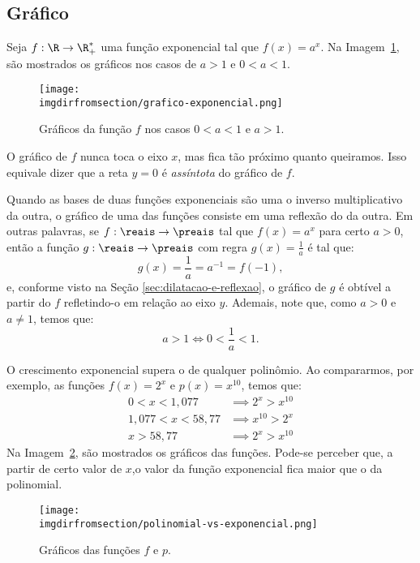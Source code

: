 \subsection{Gráfico}

\begin{example}
	Seja $f: \R \to \R_+^*$ uma função exponencial tal que $f(x) = a^x$. Na Imagem~\ref{img:graficos-exponencial}, são mostrados os gráficos nos casos de $a > 1$ e $0 < a < 1$.
	\begin{figure}[H]
		\centering
		\texttt{[image: \\imgdirfromsection/grafico-exponencial.png]}
		\caption{Gráficos da função $f$ nos casos $0<a<1$ e $a>1$.}
		\label{img:graficos-exponencial}
	\end{figure}
	O gráfico de $f$ nunca toca o eixo $x$, mas fica tão próximo quanto queiramos. Isso equivale dizer que a reta $y=0$ é \emph{assíntota} do gráfico de $f$.
\end{example}

\begin{remark}
	Quando as bases de duas funções exponenciais são uma o inverso multiplicativo da outra, o gráfico de uma das funções consiste em uma reflexão do da outra. Em outras palavras, se $f:\reais \to \preais$ tal que $f(x) = a^x $ para certo $a > 0$, então a função $g:\reais \to \preais$ com regra $g(x) = \frac 1 a$ é tal que:
	\[
		g(x) = \frac 1 a = a^{-1} = f(-1),    
	\]
	e, conforme visto na Seção \ref{sec:dilatacao-e-reflexao}, o gráfico de $g$ é obtível a partir do $f$ refletindo-o em relação ao eixo $y$. Ademais, note que, como $a > 0$ e $a \ne 1$, temos que:
	\[
		a > 1 \iff 0 < \frac{1}{a} < 1.
	\]
\end{remark}

\begin{example}
	O crescimento exponencial supera o de qualquer polinômio. Ao compararmos, por exemplo, as funções $f(x) = 2^x$ e $p(x)=x^{10}$, temos que:
	\begin{align*}
		0<x<1{,}077 & \implies  2^x > x^{10} \\
		1{,}077 < x < 58{,}77 & \implies  x^{10} > 2^x \\
		x>58{,}77 & \implies  2^x > x^{10}
	\end{align*}
	Na Imagem~\ref{img:polinomial-vs-exponencial}, são mostrados os gráficos das funções. Pode-se perceber que, a partir de certo valor de $x$,o valor da função exponencial fica maior que o da polinomial. 
	\begin{figure}[H]
		\centering
		\texttt{[image: \\imgdirfromsection/polinomial-vs-exponencial.png]}
		\caption{Gráficos das funções $f$ e $p$.}
		\label{img:polinomial-vs-exponencial}
	\end{figure}
\end{example}

